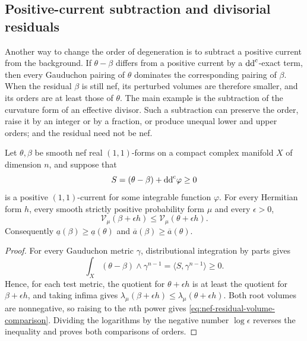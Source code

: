 \subsection{Positive-current subtraction and divisorial residuals}\label{sec:nef-divisorial-residuals}

Another way to change the order of degeneration is to subtract a positive current from the background. If $\theta-\beta$ differs from a positive current by a $\mathrm{dd}^{\mathrm{c}}$-exact term, then every Gauduchon pairing of $\theta$ dominates the corresponding pairing of $\beta$. When the residual $\beta$ is still nef, its perturbed volumes are therefore smaller, and its orders are at least those of $\theta$. The main example is the subtraction of the curvature form of an effective divisor. Such a subtraction can preserve the order, raise it by an integer or by a fraction, or produce unequal lower and upper orders; and the residual need not be nef.

\begin{proposition}\label{prop:nef-positive-current-subtraction}
Let $\theta,\beta$ be smooth nef real $(1,1)$-forms on a compact complex manifold $X$ of dimension $n$, and suppose that
\[
 S=(\theta-\beta)+\mathrm{dd}^{\mathrm{c}}\varphi\geq0
\]
is a positive $(1,1)$-current for some integrable function $\varphi$. For every Hermitian form $h$, every smooth strictly positive probability form $\mu$ and every $\epsilon>0$,
\begin{equation}\label{eq:nef-residual-volume-comparison}
 \mathcal V_\mu(\beta+\epsilon h)\leq \mathcal V_\mu(\theta+\epsilon h).
\end{equation}
Consequently $\underline a(\beta)\geq\underline a(\theta)$ and $\overline a(\beta)\geq\overline a(\theta)$.
\end{proposition}

\begin{proof}
For every Gauduchon metric $\gamma$, distributional integration by parts gives
\[
 \int_X(\theta-\beta)\wedge\gamma^{n-1}
 =\langle S,\gamma^{n-1}\rangle\geq0.
\]
Hence, for each test metric, the quotient for $\theta+\epsilon h$ is at least the quotient for $\beta+\epsilon h$, and taking infima gives $\lambda_\mu(\beta+\epsilon h)\leq\lambda_\mu(\theta+\epsilon h)$. Both root volumes are nonnegative, so raising to the $n$th power gives \eqref{eq:nef-residual-volume-comparison}. Dividing the logarithms by the negative number $\log\epsilon$ reverses the inequality and proves both comparisons of orders.
\end{proof}

